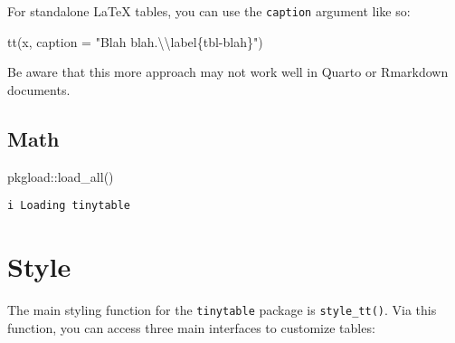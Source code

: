 \documentclass[
  letterpaper,
  DIV=11,
  numbers=noendperiod]{scrartcl}
\newenvironment{Shaded}{\begin{snugshade}}{\end{snugshade}}
\newcommand{\AttributeTok}[1]{\textcolor[rgb]{0.40,0.45,0.13}{#1}}
\newcommand{\ConstantTok}[1]{\textcolor[rgb]{0.56,0.35,0.01}{#1}}
\newcommand{\FunctionTok}[1]{\textcolor[rgb]{0.28,0.35,0.67}{#1}}
\newcommand{\NormalTok}[1]{\textcolor[rgb]{0.00,0.23,0.31}{#1}}
\newcommand{\OtherTok}[1]{\textcolor[rgb]{0.00,0.23,0.31}{#1}}
\newcommand{\SpecialCharTok}[1]{\textcolor[rgb]{0.37,0.37,0.37}{#1}}
\newcommand{\StringTok}[1]{\textcolor[rgb]{0.13,0.47,0.30}{#1}}
\begin{document}
For standalone LaTeX tables, you can use the \texttt{caption} argument
like so:

\begin{Shaded}
\begin{Highlighting}[]
\FunctionTok{tt}\NormalTok{(x, }\AttributeTok{caption =} \StringTok{"Blah blah.}\SpecialCharTok{\textbackslash{}\textbackslash{}}\StringTok{label\{tbl{-}blah\}"}\NormalTok{)}
\end{Highlighting}
\end{Shaded}

Be aware that this more approach may not work well in Quarto or
Rmarkdown documents.

\subsection{Math}\label{math}

\begin{Shaded}
\begin{Highlighting}[]
\NormalTok{pkgload}\SpecialCharTok{::}\FunctionTok{load\_all}\NormalTok{()}
\end{Highlighting}
\end{Shaded}

\begin{verbatim}
i Loading tinytable
\end{verbatim}

\begin{Shaded}
\end{Shaded}

\section{Style}\label{style}

The main styling function for the \texttt{tinytable} package is
\texttt{style\_tt()}. Via this function, you can access three main
interfaces to customize tables:
\end{document}
